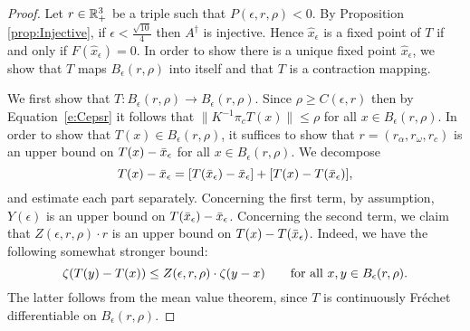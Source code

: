 \begin{proof}    
Let $r \in \mathbb{R}^3_+$ be a triple such that $P(\epsilon,r,\rho)<0$.
By Proposition \ref{prop:Injective}, if 
$\epsilon <\tfrac{\sqrt{10}}{4} $
then $ A^{\dagger}$ is injective. 
Hence $ \hat{x}_{\epsilon} $ is a fixed point of $T$ if and only if $ F( \hat{x}_{\epsilon}) = 0$.  
In order to show  there is a unique fixed point $ \hat{x}_{\epsilon}$, we show that $T$ maps  $ B_{\epsilon}(r,\rho) $ into itself and that $ T $ is a contraction mapping. 

We first show that $T: B_\epsilon(r,\rho) \to B_\epsilon(r,\rho)$. 
Since $ \rho \geq C(\epsilon,r)$ then by Equation~\eqref{e:Cepsr} it follows that $ \| K^{-1} \pi_c T( x) \| \leq \rho$ for all $ x \in B_\epsilon(r,\rho)$.
In order to show that $T(x) \in B_\epsilon(r,\rho)$, it suffices to show that $ r=(r_\alpha , r_\omega, r_c)$ is an upper bound on $ T(x) - \bar{x}_\epsilon$
for all $ x \in B_\epsilon(r,\rho)$.  
We decompose 
\begin{equation}\label{e:Tsplit}
	T(x) - \bar{x}_\epsilon = [T(\bar{x}_\epsilon) -\bar{x}_\epsilon] +
	[T(x) - T(\bar{x}_\epsilon)],
\end{equation}
and estimate each part separately. Concerning the first term,
by assumption, $Y(\epsilon)$ is an upper bound on $T(\bar{x}_\epsilon) - \bar{x}_\epsilon$. 
%
Concerning the second term, we claim that $ Z(\epsilon,r,\rho) \cdot r$ is an upper bound on $T(x) - T(\bar{x}_\epsilon)$.
Indeed, we have the following somewhat stronger bound: 
\begin{equation}\label{e:DTisboundedbyZ}
	\zeta(T(y) - T(x)) \leq Z(\epsilon,r,\rho) \cdot \zeta(y-x)
	\qquad\text{for all } x,y \in B_\epsilon(r,\rho) .
\end{equation}
The latter follows from the mean value theorem, since 
$T$ is continuously Fr\'echet differentiable on $B_\epsilon(r,\rho)$.
%

\end{proof}
